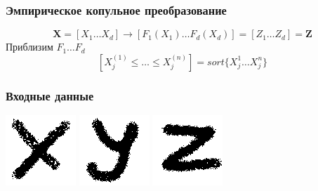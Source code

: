\documentclass[14pt]{beamer}
\begin{document}
\begin{frame}
    \frametitle{Эмпирическое копульное преобразование}
    $$\mathbf X = [X_1 \dots X_d] \to [F_1(X_1) \dots F_d(X_d)] = [Z_1 \dots Z_d] = \mathbf Z $$
    Приблизим $F_1 \dots F_d $
    $$[ X^{(1)}_j \le \dots \le X^{(n)}_j ] = sort \{X^1_j \dots X^n_j \}$$
\end{frame}
\begin{frame}
    \frametitle{Входные данные}
    \includegraphics[scale=0.5]{x.png}
    \includegraphics[scale=0.5]{y.png}
    \includegraphics[scale=0.5]{z.png}
\end{frame}
\begin{frame}

\end{frame}
\end{document}
